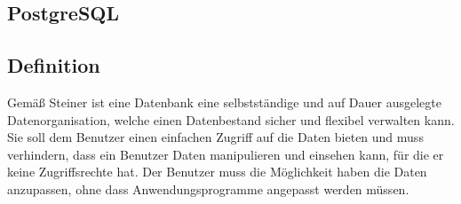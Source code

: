 \subsection{Postgre\acs{SQL}}

\subsection*{Definition}
\label{ssec:Datenbanken_Definition}
Gemäß Steiner ist eine Datenbank eine selbstständige und auf Dauer ausgelegte Datenorganisation, welche einen Datenbestand sicher und flexibel verwalten kann. Sie soll dem Benutzer einen einfachen Zugriff auf die Daten bieten und muss verhindern, dass ein Benutzer Daten manipulieren und einsehen kann, für die er keine Zugriffsrechte hat. Der Benutzer muss die Möglichkeit haben die Daten anzupassen, ohne dass Anwendungsprogramme angepasst werden müssen.\autocite[Vgl.][S.5 f.]{Book_DB_2} 

